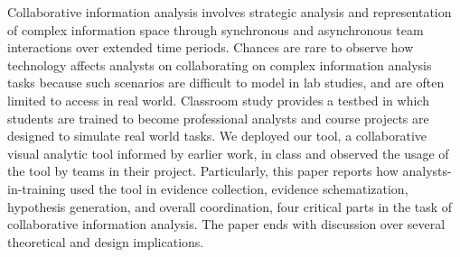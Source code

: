 
Collaborative information analysis involves strategic analysis and representation of complex information space through synchronous and asynchronous team interactions over extended time periods. Chances are rare to observe how technology affects analysts on collaborating on complex information analysis tasks because such scenarios are difficult to model in lab studies, and are often limited to access in real world. Classroom study provides a testbed in which students are trained to become professional analysts and course projects are designed to simulate real world tasks. We deployed our tool, a collaborative visual analytic tool informed by earlier work, in class and observed the usage of the tool by teams in their project. Particularly, this paper reports how analysts-in-training used the tool in evidence collection, evidence schematization, hypothesis generation, and overall coordination, four critical parts in the task of collaborative information analysis. The paper ends with discussion over several theoretical and design implications.
%
